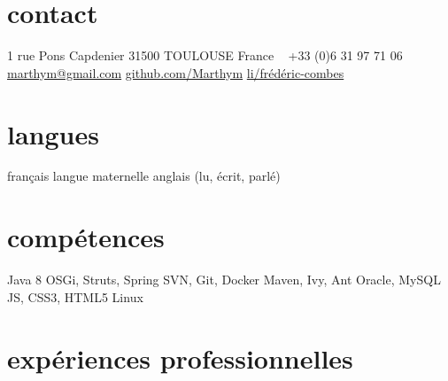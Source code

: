 \documentclass{friggeri-cv} 	%
\begin{document}


\begin{aside} %
\section{contact}
1 rue Pons Capdenier
31500 TOULOUSE
France
~
+33 (0)6 31 97 71 06
\href{mailto:marthym@gmail.com}{marthym@gmail.com}
\href{https://github.com/Marthym}{github.com/Marthym}
\href{https://fr.linkedin.com/pub/frédéric-combes/91/820/108/}{li/frédéric-combes}
\section{langues}
français langue maternelle
anglais (lu, écrit, parlé)
\section{compétences}
Java 8
OSGi, Struts, Spring
SVN, Git, Docker
Maven, Ivy, Ant
Oracle, MySQL
JS, CSS3, HTML5
Linux
\end{aside}

\section{expériences professionnelles}
\end{document}

